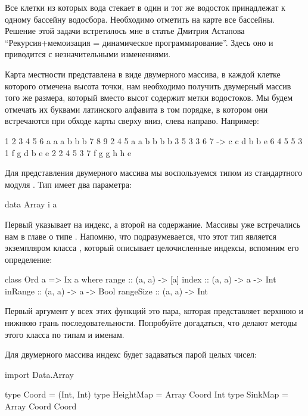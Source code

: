 Все клетки из которых вода стекает в один и тот же водосток принадлежат
к одному бассейну водосбора. Необходимо отметить на карте все бассейны.
Решение этой задачи встретилось мне в статье Дмитрия Астапова
``Рекурсия+мемоизация = динамическое программирование''. Здесь оно и
приводится с незначительными изменениями.

Карта местности представлена в виде двумерного массива, в каждой клетке
которого отмечена высота точки, нам необходимо получить двумерный массив
того же размера, который вместо высот содержит метки водостоков. Мы
будем отмечать их буквами латинского алфавита в том порядке, в котором
они встречаются при обходе карты сверху вниз, слева направо. Например:


\begin{code}
1 2 3 4 5 6       a a a b b b
7 8 9 2 4 5       a a b b b b
3 5 3 3 6 7   ->  c c d b b e 
6 4 5 5 3 1       f g d b e e
2 2 4 5 3 7       f g g h h e
\end{code}

Для представления двумерного массива мы воспользуемся типом 
из стандартного модуля . Тип  имеет два
параметра:


\begin{code}
data Array i a
\end{code}

Первый указывает на индекс, а второй на содержание. Массивы уже
встречались нам в главе о типе . Напомню, что подразумевается,
что этот тип является экземпляром класса , который описывает
целочисленные индексы, вспомним его определение:


\begin{code}
class Ord a => Ix a where
    range       :: (a, a) -> [a]
    index       :: (a, a) -> a -> Int
    inRange     :: (a, a) -> a -> Bool
    rangeSize   :: (a, a) -> Int
\end{code}

Первый аргумент у всех этих функций это пара, которая представляет
верхнюю и нижнюю грань последовательности. Попробуйте догадаться, что
делают методы этого класса по типам и именам.

Для двумерного массива индекс будет задаваться парой целых чисел:


\begin{code}
import Data.Array

type Coord = (Int, Int)
type HeightMap = Array Coord Int
type SinkMap   = Array Coord Coord
\end{code}

